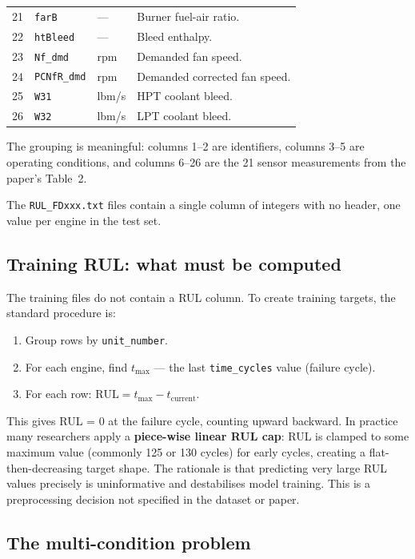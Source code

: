 \documentclass[11pt, a4paper]{article}
\begin{document}
\begin{table}[H]
\begin{tabular}{@{}rllp{5.5cm}@{}}
    21 & \texttt{farB}          & ---     & Burner fuel-air ratio. \\
    22 & \texttt{htBleed}       & ---     & Bleed enthalpy. \\
    23 & \texttt{Nf\_dmd}       & rpm     & Demanded fan speed. \\
    24 & \texttt{PCNfR\_dmd}    & rpm     & Demanded corrected fan speed. \\
    25 & \texttt{W31}           & lbm/s   & HPT coolant bleed. \\
    26 & \texttt{W32}           & lbm/s   & LPT coolant bleed. \\
    \bottomrule
  \end{tabular}
\end{table}

The grouping is meaningful: columns 1--2 are identifiers,
columns 3--5 are operating conditions, and columns 6--26 are
the 21 sensor measurements from the paper's Table~2.

The \texttt{RUL\_FDxxx.txt} files contain a single column of
integers with no header, one value per engine in the test set.

\subsection{Training RUL: what must be computed}

The training files do not contain a RUL column. To create
training targets, the standard procedure is:

\begin{enumerate}[noitemsep]
  \item Group rows by \texttt{unit\_number}.
  \item For each engine, find $t_\text{max}$ --- the last
        \texttt{time\_cycles} value (failure cycle).
  \item For each row: $\text{RUL} = t_\text{max} - t_\text{current}$.
\end{enumerate}

This gives RUL = 0 at the failure cycle, counting upward backward.
In practice many researchers apply a \textbf{piece-wise linear RUL
cap}: RUL is clamped to some maximum value (commonly 125 or 130
cycles) for early cycles, creating a flat-then-decreasing target
shape. The rationale is that predicting very large RUL values
precisely is uninformative and destabilises model training. This
is a preprocessing decision not specified in the dataset or paper.

\subsection{The multi-condition problem}
\end{document}
